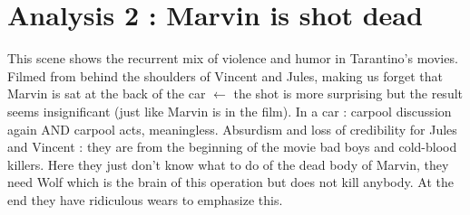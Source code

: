 \documentclass[a4paper,12pt]{article}
\begin{document}
\section{Analysis 2 : Marvin is shot dead}

This scene shows the recurrent mix of violence and humor in Tarantino's movies.
Filmed from behind the shoulders of Vincent and Jules, making us forget that Marvin is sat at the back of the car $\leftarrow$ the shot is more surprising but the result seems insignificant (just like Marvin is in the film). In a car : carpool discussion again AND carpool acts, meaningless.
Absurdism and loss of credibility for Jules and Vincent : they are from the beginning of the movie bad boys and cold-blood killers. Here they just don't know what to do of the dead body of Marvin, they need Wolf which is the brain of this operation but does not kill anybody. At the end they have ridiculous wears to emphasize this.
\end{document}
